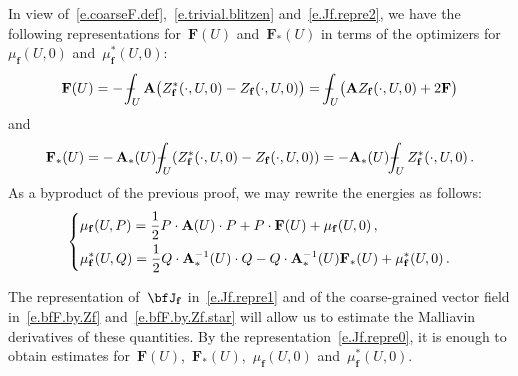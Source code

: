 \documentclass[11pt,twoside]{article} %
\numberwithin{equation}{section}
\theoremstyle{definition}
\let\originalleft\left
\let\originalright\right
\renewcommand{\left}{\mathopen{}\mathclose\bgroup\originalleft}
\renewcommand{\right}{\aftergroup\egroup\originalright}
\newcommand{\f}{\mathbf{f}}
\def\Xint#1{\mathchoice
{\XXint\displaystyle\textstyle{#1}}%
{\XXint\textstyle\scriptstyle{#1}}%
{\XXint\scriptstyle\scriptscriptstyle{#1}}%
{\XXint\scriptscriptstyle\scriptscriptstyle{#1}}%
\!\int}
\def\XXint#1#2#3{{\setbox0=\hbox{$#1{#2#3}{\int}$}
\vcenter{\hbox{$#2#3$}}\kern-.5\wd0}}
\def\fint{\Xint-}
\newcommand{\bfA}{\mathbf{A}}
\newcommand{\bfF}{\mathbf{F}}
\begin{document}
In view of~\eqref{e.coarseF.def},~\eqref{e.trivial.blitzen} and~\eqref{e.Jf.repre2}, we have the following representations for~$\bfF(U)$ and~$\bfF_*(U)$ in terms of the optimizers for~$\mu_{\f}(U,0)$ and~$\mu_{\f}^*(U,0)$: 
\begin{equation}
\label{e.bfF.by.Zf}
\bfF(U) 
=
-\,
\fint_{U}  \bfA \bigl( Z_{\f}^*(\cdot,U,0) - Z_{\f}(\cdot,U,0) \bigr) 
= 
\fint_{U} \bigl( \bfA  Z_{\f}(\cdot,U,0) +  2\bfF\bigr) 
\end{equation}
and
\begin{equation}
\label{e.bfF.by.Zf.star}
\bfF_*(U) 
=
-\,
\bfA_{*}(U) \fint_{U} ( Z_{\f}^*(\cdot,U,0) - Z_{\f}(\cdot,U,0)) = - \bfA_{*}(U)  \fint_{U} Z_{\f}^*(\cdot,U,0) 
\,.
\end{equation}
As a byproduct of the previous proof, we may rewrite the energies as follows:
\begin{equation} 
\label{e.mu.f.mustar.f.formula}
\left\{
\begin{aligned}
& \mu_{\f}(U,P) = 
\frac12 P \cdot \bfA(U) \cdot P
+ P \cdot   \bfF(U)  
 + \mu_{\f}(U,0)
\,,  
\\
& \mu_{\f}^*(U,Q) 
= 
\frac12 Q \cdot \bfA_*^{-1} (U) \cdot Q - Q \cdot \bfA_*^{-1}(U) \bfF_*(U) 
+ \mu_{\f}^*(U,0) 
\,.
\end{aligned}
\right.
\end{equation}


\smallskip

The representation of~$\bfJ_{\f}$ in~\eqref{e.Jf.repre1} and of the coarse-grained vector field in~\eqref{e.bfF.by.Zf} and~\eqref{e.bfF.by.Zf.star} will allow us to estimate the Malliavin derivatives of these quantities. By the representation~\eqref{e.Jf.repre0}, it is enough to obtain estimates for~$\bfF(U)$,~$\bfF_*(U)$,~$\mu_{\f}(U,0)$ and~$\mu_{\f}^*(U,0)$. 
\end{document}
